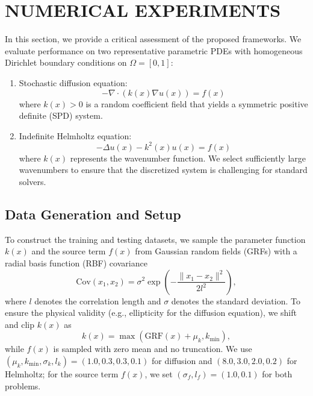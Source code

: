 \documentclass[11pt]{article}
\begin{document}
\section{NUMERICAL EXPERIMENTS} \label{sec:numerical_experiments}
In this section, we provide a critical assessment of the proposed frameworks. We evaluate performance on two representative parametric PDEs with homogeneous Dirichlet boundary conditions on $\Omega=[0,1]$:
\begin{enumerate}
    \item Stochastic diffusion equation:
          \begin{equation}
              -\nabla\cdot\left(k(x)\nabla u(x)\right)  =f(x)
          \end{equation}
          where $k(x)>0$ is a random coefficient field that yields a symmetric positive definite (SPD) system.

    \item Indefinite Helmholtz equation:
          \begin{equation}
              -\Delta u(x) - k^2(x)u(x) = f(x)
          \end{equation}
          where $k(x)$ represents the wavenumber function. We select sufficiently large wavenumbers to ensure that the discretized system is challenging for standard solvers.
\end{enumerate}

\subsection{Data Generation and Setup}
To construct the training and testing datasets, we sample the parameter function $k(x)$ and the source term $f(x)$ from Gaussian random fields (GRFs) with a radial basis function (RBF) covariance
\begin{equation}
    \text{Cov}({x}_1, {x}_2) = \sigma^2 \exp\left( - \frac{\|x_1 - x_2\|^2}{2l^2} \right),
\end{equation}
where $l$ denotes the correlation length and $\sigma$ denotes the standard deviation. To ensure the physical validity (e.g., ellipticity for the diffusion equation), we shift and clip $k(x)$ as
\begin{equation}
    k(x) = \max({\text{GRF}}(x) + \mu_k, k_{\min}),
\end{equation}
while $f(x)$ is sampled with zero mean and no truncation. We use $(\mu_k,k_{\min},\sigma_k,l_k)=(1.0,0.3,0.3,0.1)$ for diffusion and $(8.0,3.0,2.0,0.2)$ for Helmholtz; for the source term $f(x)$, we set $(\sigma_f,l_f)=(1.0,0.1)$ for both problems.
\end{document}
